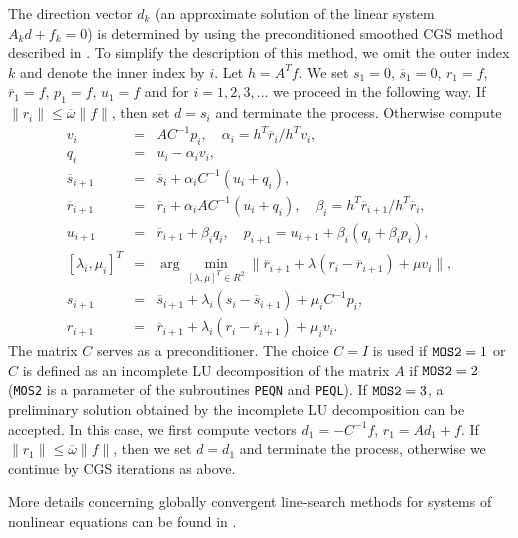 \documentclass{esub2acm}
\newcommand{\beq}{\begin{eqnarray*}}
\newcommand{\eeq}{\end{eqnarray*}}
\begin{document}
The direction vector $d_k$ (an approximate solution of the linear system
$A_k d + f_k = 0$) is determined by using the preconditioned smoothed
CGS method described in \cite{ton1}.
To simplify the description of this method, we omit the outer index $k$ and
denote the inner index by $i$. Let $h = A^T f$.
We set $s_1 = 0$, $\overline{s}_1 = 0$,
$r_1 = f$, $\overline{r}_1 = f$, $p_1 = f$, $u_1 = f$
and for $i = 1,2,3, \dots$ we proceed in the following way.
If $\| r_i \| \leq \overline{\omega} \| f \|$, then set $d = s_i$ and
terminate the process. Otherwise compute
\beq
v_i  & = & A C^{-1} p_i, \quad \alpha_i = h^T \overline{r}_i / h^T v_i, \\
q_i  & = & u_i - \alpha_i v_i, \\
\overline{s}_{i+1} & = & \overline{s}_i + \alpha_i C^{-1} (u_i + q_i), \\
\overline{r}_{i+1} & = & \overline{r}_i + \alpha_i A C^{-1} (u_i + q_i),
\quad \beta_i = h^T\overline{r}_{i+1} / h^T \overline{r}_i, \\
u_{i+1} & = & \overline{r}_{i+1} + \beta_i  q_i, \quad
p_{i+1} = u_{i+1} + \beta_i  (q_i + \beta_i p_i), \\
\left [ \lambda_i, \mu_i \right ]^T  & = & \arg \min_{\left
[\lambda,\mu \right ]^T \in R^2} \| \overline{r}_{i+1} +
\lambda (r_i - \overline{r}_{i+1}) + \mu v_i \|, \\
s_{i+1} & = & \overline{s}_{i+1} + \lambda_i  (s_i -
\overline{s}_{i+1}) + \mu_i C^{-1}p_i, \\
r_{i+1} & = & \overline{r}_{i+1} + \lambda_i  (r_i -
\overline{r}_{i+1}) + \mu_i v_i.
\eeq
%
The matrix $C$ serves as a preconditioner. The choice $C = I$ is used if
${\tt MOS2}=1$ or $C$ is defined as an incomplete LU decomposition of
the matrix $A$ if ${\tt MOS2}=2$ ({\tt MOS2} is a parameter of the subroutines
{\tt PEQN} and {\tt PEQL}). If ${\tt MOS2}=3$, a preliminary solution
obtained by the incomplete LU decomposition can be accepted. In
this case, we first compute vectors $d_1 = - C^{-1} f$, $r_1 = A d_1 + f$.
If $\| r_1 \| \leq \overline{\omega} \| f \|$, then we set $d = d_1$ and
terminate the process, otherwise we continue by CGS iterations as above.

More details concerning globally convergent line-search methods
for systems of nonlinear equations can be found in \cite{luv2}.

\vspace{5mm}

\end{document}

